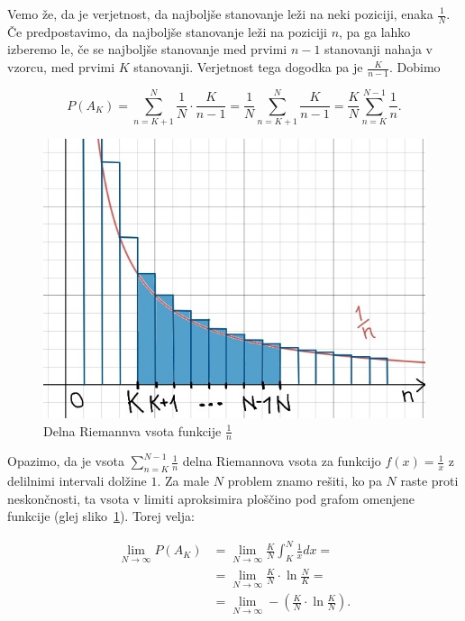 \documentclass[a4paper, 12pt, titlepage]{article}
\begin{document}
Vemo že, da je verjetnost, da najboljše stanovanje leži na neki poziciji, enaka $\frac{1}{N}$. Če predpostavimo, da najboljše stanovanje leži na poziciji $n$, pa ga lahko izberemo le, če se najboljše stanovanje med prvimi $n-1$ stanovanji nahaja v vzorcu, med prvimi $K$ stanovanji. Verjetnost tega dogodka pa je $\frac{K}{n-1}$. Dobimo

\begin{equation}\label{verezultatvsota}
    P(A_{K}) = \sum^{N}_{n=K+1} \frac{1}{N} \cdot \frac{K}{n-1}
    = \frac{1}{N} \sum^{N}_{n=K+1}\frac{K}{n-1}
    = \frac{K}{N} \sum^{N-1}_{n=K}\frac{1}{n}.
\end{equation}

\begin{figure}
    \centering
    \includegraphics[scale=1.3]{slike/graf2.jpg}
    \caption{Delna Riemannva vsota funkcije $\frac{1}{n}$}
    \label{graf_1/n}
\end{figure}

Opazimo, da je vsota $\sum^{N-1}_{n=K}\frac{1}{n}$ delna Riemannova vsota za funkcijo $f(x)=\frac{1}{x}$ z delilnimi intervali dolžine $1$. Za male $N$ problem znamo rešiti, ko pa $N$ raste proti neskončnosti, ta vsota v limiti aproksimira ploščino pod grafom omenjene funkcije (glej sliko~\ref{graf_1/n}). Torej velja:

\begin{align*}
    \lim_{N \rightarrow \infty} P(A_{K}) &= \lim_{N \rightarrow \infty} \frac{K}{N} \int^N_{K}\frac{1}{x}dx = \\
    &= \lim_{N \rightarrow \infty} \frac{K}{N} \cdot \ln\frac{N}{K} = \\
    &= \lim_{N \rightarrow \infty} -(\frac{K}{N} \cdot \ln\frac{K}{N}).
\end{align*}
\end{document}
